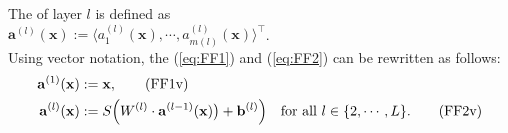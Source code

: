The  of layer $l$ is defined as
\\[0.2cm]
\hspace*{1.3cm}
$\mathbf{a}^{(l)}(\mathbf{x}) := \langle a_1^{(l)}(\mathbf{x}), \cdots, a_{m(l)}^{(l)}(\mathbf{x}) \rangle^\top$.
\\[0.2cm]
Using vector notation, the  (\ref{eq:FF1}) and (\ref{eq:FF2}) can be
rewritten as follows:
\begin{align}
  \label{eq:FF1v}
  \mathbf{a}^{(1)}(\mathbf{x}) & := \mathbf{x},
  \tag{FF1v} \\ 
  \label{eq:FF2v}
  \mathbf{a}^{(l)}(\mathbf{x}) & := 
  S\Bigl( W^{(l)} \cdot \mathbf{a}^{(l-1)}(\mathbf{x})\bigr) + \mathbf{b}^{(l)}\Bigr)
  \quad \mbox{for all $l \in \{2, \cdots, L\}$}.
  \tag{FF2v}
\end{align}

